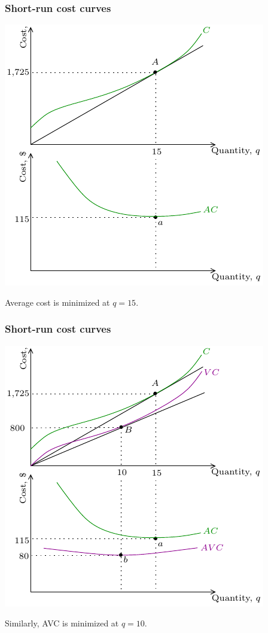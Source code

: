 \documentclass[xcolor=pdftex,dvipsnames]{beamer}
\begin{document}
\begin{frame}
\frametitle{Short-run cost curves}
\begin{center}
\includegraphics{pics/ShortRunCC4}
\end{center}
Average cost is minimized at $q=15$.
\end{frame}

\begin{frame}
\frametitle{Short-run cost curves}
\begin{center}
\includegraphics{pics/ShortRunCC5}
\end{center}
Similarly, AVC is minimized at $q=10$.
\end{frame}
\end{document}
